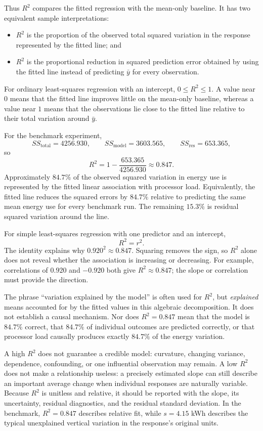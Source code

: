 Thus $R^2$ compares the fitted regression with the mean-only baseline. It has two equivalent sample interpretations:
\begin{itemize}
    \item $R^2$ is the proportion of the observed total squared variation in the response represented by the fitted line; and
    \item $R^2$ is the proportional reduction in squared prediction error obtained by using the fitted line instead of predicting $\bar y$ for every observation.
\end{itemize}
For ordinary least-squares regression with an intercept, $0\leq R^2\leq1$. A value near $0$ means that the fitted line improves little on the mean-only baseline, whereas a value near $1$ means that the observations lie close to the fitted line relative to their total variation around $\bar y$.

For the benchmark experiment,
\[
SS_{\text{total}}=4256.930,
\qquad
SS_{\text{model}}=3603.565,
\qquad
SS_{\text{res}}=653.365,
\]
so
\[
R^2
=1-\frac{653.365}{4256.930}
\approx0.847.
\]
Approximately $84.7\%$ of the observed squared variation in energy use is represented by the fitted linear association with processor load. Equivalently, the fitted line reduces the squared errors by $84.7\%$ relative to predicting the same mean energy use for every benchmark run. The remaining $15.3\%$ is residual squared variation around the line.

For simple least-squares regression with one predictor and an intercept,
\[
R^2=r^2.
\]
The identity explains why $0.920^2\approx0.847$. Squaring removes the sign, so $R^2$ alone does not reveal whether the association is increasing or decreasing. For example, correlations of $0.920$ and $-0.920$ both give $R^2\approx0.847$; the slope or correlation must provide the direction.

The phrase ``variation explained by the model'' is often used for $R^2$, but \emph{explained} means accounted for by the fitted values in this algebraic decomposition. It does not establish a causal mechanism. Nor does $R^2=0.847$ mean that the model is $84.7\%$ correct, that $84.7\%$ of individual outcomes are predicted correctly, or that processor load causally produces exactly $84.7\%$ of the energy variation.

A high $R^2$ does not guarantee a credible model: curvature, changing variance, dependence, confounding, or one influential observation may remain. A low $R^2$ does not make a relationship useless: a precisely estimated slope can still describe an important average change when individual responses are naturally variable. Because $R^2$ is unitless and relative, it should be reported with the slope, its uncertainty, residual diagnostics, and the residual standard deviation. In the benchmark, $R^2=0.847$ describes relative fit, while $s=4.15$ kWh describes the typical unexplained vertical variation in the response's original units.

